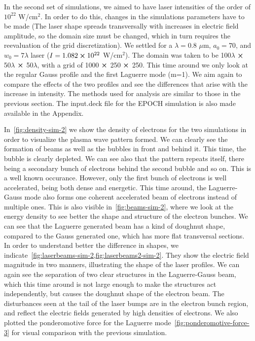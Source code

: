 \documentclass[12pt, class=report, crop=false]{standalone}
\begin{document}
In the second set of simulations, we aimed to have laser intensities of the order of $10^{22}$ W/cm$^2$. In order to do this, changes in the simulations parameters have to be made (The laser shape spreads transversally with increases in electric field amplitude, so the domain size must be changed, which in turn requires the reevaluation of the grid discretization). We settled for a \(\lambda = 0.8\) \(\mu\)m, \(a_0=70\), and \(w_0 = 7\lambda\) laser (\(I = 1.082\cp 10^{22}\) W/cm$^2$). The domain was taken to be 100\(\lambda\) $\cp$ 50\(\lambda\) $\cp$ 50\(\lambda\), with a grid of 1000 $\cp$ 250 $\cp$ 250. This time around we only look at the regular Gauss profile and the first Laguerre mode (m=1). We aim again to compare the effects of the two profiles and see the differences that arise with the increase in intensity. The methods used for analysis are similar to those in the previous section. The input.deck file for the EPOCH simulation is also made available in the Appendix.

In~\cref{fig:density-sim-2} we show the density of electrons for the two simulations in order to visualize the plasma wave pattern formed. We can clearly see the formation of beams as well as the bubbles in front and behind it. This time, the bubble is clearly depleted. We can see also that the pattern repeats itself, there being a secondary bunch of electrons behind the second bubble and so on. This is a well known occurance. However, only the first bunch of electrons is well accelerated, being both dense and energetic. This time around, the Laguerre-Gauss mode also forms one coherent accelerated beam of electrons instead of multiple ones. This is also visible in~\cref{fig:beams-sim-2}, where we look at the energy density to see better the shape and structure of the electron bunches. We can see that the Laguerre generated beam has a kind of doughnut shape, compared to the Gauss generated one, which has more flat transversal sections. In order to understand better the difference in shapes, we indicate~\cref{fig:laserbeams-sim-2,fig:laserbeams2-sim-2}. They show the electric field magnitude in two manners, illustrating the shape of the laser profiles. We can again see the separation of two clear structures in the Laguerre-Gauss beam, which this time around is not large enough to make the structures act independently, but causes the doughnut shape of the electron beam. The disturbances seen at the tail of the laser bumps are in the electron bunch region, and reflect the electric fields generated by high densities of electrons. We also plotted the ponderomotive force for the Laguerre mode~\cref{fig:ponderomotive-force-3} for visual comparison with the previous simulation.
\end{document}
